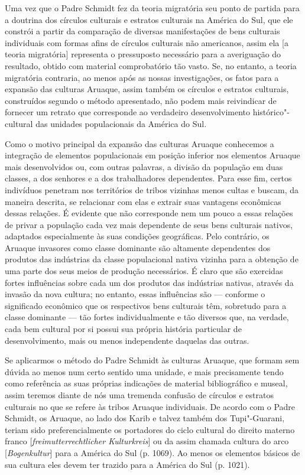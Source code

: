 Uma vez que o Padre Schmidt fez da teoria migratória seu ponto de
partida para a doutrina dos círculos culturais e estratos culturais na
América do Sul, que ele constrói a partir da comparação de diversas
manifestações de bens culturais individuais com formas afins de
círculos culturais não americanos, assim ela {[}a teoria migratória{]}
representa o pressuposto necessário para a averiguação do resultado,
obtido com material comprobatório tão vasto. Se, no entanto, a teoria
migratória contraria, ao menos após as nossas investigações, os fatos
para a expansão das culturas Aruaque, assim também os círculos e
estratos culturais, construídos segundo o método apresentado, não podem
mais reivindicar de fornecer um retrato que corresponde ao verdadeiro
desenvolvimento histórico"-cultural das unidades populacionais da América
do Sul.

Como o motivo principal da expansão das culturas Aruaque conhecemos a
integração de elementos populacionais em posição inferior nos elementos
Aruaque mais desenvolvidos ou, com outras palavras, a divisão da
população em duas classes, a dos senhores e a dos trabalhadores
dependentes. Para esse fim, certos indivíduos penetram nos territórios
de tribos vizinhas menos cultas e buscam, da maneira descrita, se
relacionar com elas e extrair suas vantagens econômicas dessas relações.
É evidente que não corresponde nem um pouco a essas relações de privar
a população cada vez mais dependente de seus bens culturais nativos,
adaptados especialmente às suas condições geográficas. Pelo contrário,
os Aruaque invasores como classe dominante são altamente dependentes
dos produtos das indústrias da classe populacional nativa vizinha para
a obtenção de uma parte dos seus meios de produção necessários. É claro
que são exercidas fortes influências sobre cada um dos produtos das
indústrias nativas, através da invasão da nova cultura; no entanto,
essas influências são --- conforme o significado econômico que os
respectivos bens culturais têm, sobretudo para a classe dominante --- tão
fortes individualmente e tão diversos que, na verdade, cada bem cultural
por si possui sua própria história particular de desenvolvimento, mais
ou menos independente daquelas das outras.

Se aplicarmos o método do Padre Schmidt às culturas Aruaque, que formam
sem dúvida ao menos num certo sentido uma unidade, e mais precisamente
tendo como referência as suas próprias indicações de material
bibliográfico e museal, assim teremos diante de nós uma tremenda
confusão de círculos e estratos culturais no que se refere às tribos
Aruaque individuais. De acordo com o Padre Schmidt, os Aruaque, ao lado
dos Karib e talvez também dos Tupi"-Guarani, teriam sido
preferencialmente os portadores do ciclo cultural do direito materno
franco {[}\emph{freimutterrechtlicher Kulturkreis}{]} ou da assim
chamada cultura do arco {[}\emph{Bogenkultur}{]} para a América do Sul
(p. 1069). Ao menos os elementos básicos de sua cultura eles devem ter
trazido para a América do Sul (p. 1021).

